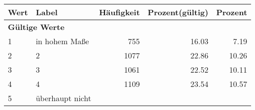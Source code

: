      \begin{longtable}{lXrrr}
     \toprule
     \textbf{Wert} & \textbf{Label} & \textbf{Häufigkeit} & \textbf{Prozent(gültig)} & \textbf{Prozent} \\
     \endhead
     \midrule
     \multicolumn{5}{l}{\textbf{Gültige Werte}}\\

     1 &
     \multicolumn{1}{X}{ in hohem Maße   } &


       \num{755} &
       \num[round-mode=places,round-precision=2]{16.03} &
         \num[round-mode=places,round-precision=2]{7.19} \\

     2 &
     \multicolumn{1}{X}{ 2   } &


       \num{1077} &
       \num[round-mode=places,round-precision=2]{22.86} &
         \num[round-mode=places,round-precision=2]{10.26} \\

     3 &
     \multicolumn{1}{X}{ 3   } &


       \num{1061} &
       \num[round-mode=places,round-precision=2]{22.52} &
         \num[round-mode=places,round-precision=2]{10.11} \\

     4 &
     \multicolumn{1}{X}{ 4   } &


       \num{1109} &
       \num[round-mode=places,round-precision=2]{23.54} &
         \num[round-mode=places,round-precision=2]{10.57} \\

     5 &
     \multicolumn{1}{X}{ überhaupt nicht   } &



\end{longtable}
